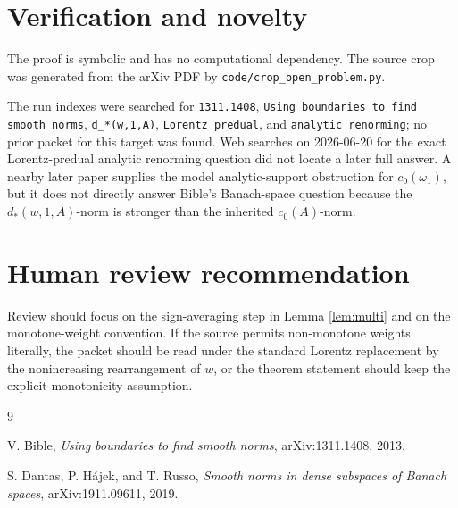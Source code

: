 \documentclass[11pt]{article}
\begin{document}
\section{Verification and novelty}

The proof is symbolic and has no computational dependency.  The source crop
was generated from the arXiv PDF by \texttt{code/crop\_open\_problem.py}.

The run indexes were searched for \texttt{1311.1408}, \texttt{Using
boundaries to find smooth norms}, \texttt{d\_*(w,1,A)}, \texttt{Lorentz
predual}, and \texttt{analytic renorming}; no prior packet for this target
was found.  Web searches on 2026-06-20 for the exact Lorentz-predual analytic
renorming question did not locate a later full answer.  A nearby later paper
\cite{dantas-hajek-russo} supplies the model analytic-support obstruction for
\(c_0(\omega_1)\), but it does not directly answer Bible's Banach-space
question because the \(d_*(w,1,A)\)-norm is stronger than the inherited
\(c_0(A)\)-norm.

\section{Human review recommendation}

Review should focus on the sign-averaging step in Lemma \ref{lem:multi} and
on the monotone-weight convention.  If the source permits non-monotone weights
literally, the packet should be read under the standard Lorentz replacement by
the nonincreasing rearrangement of \(w\), or the theorem statement should keep
the explicit monotonicity assumption.

\begin{thebibliography}{9}

V. Bible,
\emph{Using boundaries to find smooth norms},
arXiv:1311.1408, 2013.

S. Dantas, P. H\'ajek, and T. Russo,
\emph{Smooth norms in dense subspaces of Banach spaces},
arXiv:1911.09611, 2019.

\end{thebibliography}
\end{document}
